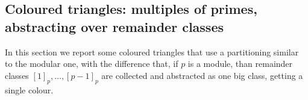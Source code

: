 \documentclass[11pt,a4paper]{article} %
\begin{document}
    
    


    
    


    
    

    
    

    \subsection{Coloured triangles: multiples of primes, abstracting over remainder classes}

    In this section we report some coloured triangles that use a partitioning similar to the modular one, 
    with the difference that, if $p$ is a module, than remainder classes $[1]_p, \ldots, [p-1]_p$
    are collected and abstracted as one big class, getting a single colour.
\end{document}
